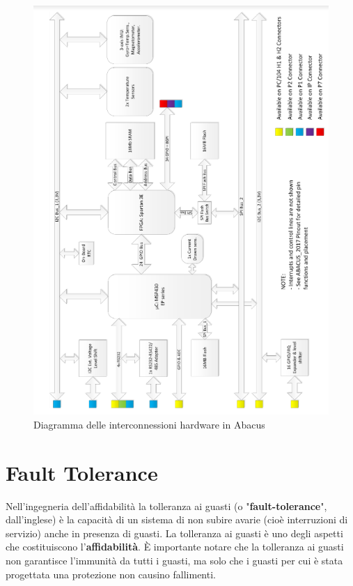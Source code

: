 \documentclass[LaM,binding=0.6cm]{../sapthesis}
\begin{document}
    \begin{figure}[htbp]
    \centerline{\includegraphics[scale=.8]{examples/AbacusDiagram.PNG}}
    \caption{Diagramma delle interconnessioni hardware in Abacus}
    \label{fig}
    \end{figure}
\clearpage
\chapter{Fault Tolerance}
Nell'ingegneria dell'affidabilità la tolleranza ai guasti (o "\textbf{fault-tolerance}", dall'inglese) è la capacità di un sistema di non subire avarie (cioè interruzioni di servizio) anche in presenza di guasti. La tolleranza ai guasti è uno degli aspetti che costituiscono l'\textbf{affidabilità}. È importante notare che la tolleranza ai guasti non garantisce l'immunità da tutti i guasti, ma solo che i guasti per cui è stata progettata una protezione non causino fallimenti.
\end{document}
